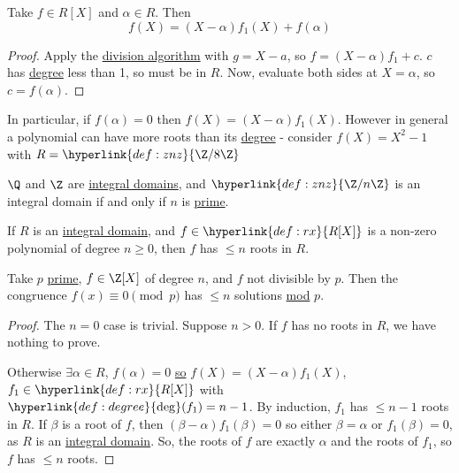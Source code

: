\documentclass{article}
\begin{document}
\begin{ncor}\label{cor:remainderThm}
    Take $f \in R[X]$ and $\alpha \in R$. Then \begin{equation*}f(X) = (X-\alpha) f_1(X) + f(\alpha)\end{equation*}
\end{ncor}

\begin{proof}
    Apply the \hyperlink{def:polyDivisionAlg}{division algorithm} with $g=X-a$, so $f = (X-\alpha) f_1 + c$.
    $c$ has \hyperlink{def:degree}{degree} less than 1, so must be in $R$.
    Now, evaluate both sides at $X = \alpha$, so $c = f(\alpha)$.
\end{proof}

In particular, if $f(\alpha) = 0$ then $f(X) = (X - \alpha) f_1(X)$.
However in general a polynomial can have more roots than its \hyperlink{def:degree}{degree} - consider $f(X) = X^2 - 1$ with $R = \hyperlink{def:znz}{\Z / 8\Z}$


\begin{eg}
    $\Q$ and $\Z$ are \hyperlink{def:intDom}{integral domains}, and $\hyperlink{def:znz}{\Z/n\Z}$ is an integral domain if and only if $n$ is \hyperlink{def:prime}{prime}.
\end{eg}

\begin{nthm}\label{thm:2.7}
    If $R$ is an \hyperlink{def:intDom}{integral domain}, and $f \in \hyperlink{def:rx}{R[X]}$ is a non-zero polynomial of degree $n \geq 0$, then $f$ has $\leq n$ roots in $R$.
\end{nthm}

\begin{cor}
    Take $p$ \hyperlink{def:prime}{prime}, $f \in \Z[X]$ of degree $n$, and $f$ not divisible by $p$.
    Then the congruence $f(x) \equiv 0 \pmod{p}$ has $\leq n$ solutions \hyperlink{def:mod}{mod} $p$.
\end{cor}

\begin{proof}
    The $n=0$ case is trivial.
    Suppose $n > 0$. If $f$ has no roots in $R$, we have nothing to prove.

    Otherwise $\exists \alpha \in R$, $f(\alpha) = 0$ \hyperlink{def:polyDivisionAlg}{so} $f(X) = (X - \alpha) f_1(X)$, $f_1 \in \hyperlink{def:rx}{R[X]}$ with $\hyperlink{def:degree}{\deg}(f_1) = n-1$.
    By induction, $f_1$ has $\leq n-1$ roots in $R$.
    If $\beta$ is a root of $f$, then $(\beta-\alpha) f_1(\beta) = 0$ so either $\beta = \alpha$ or $f_1(\beta) = 0$, as $R$ is an \hyperlink{def:intDom}{integral domain}.
    So, the roots of $f$ are exactly $\alpha$ and the roots of $f_1$, so $f$ has $\leq n$ roots.
\end{proof}
\end{document}
